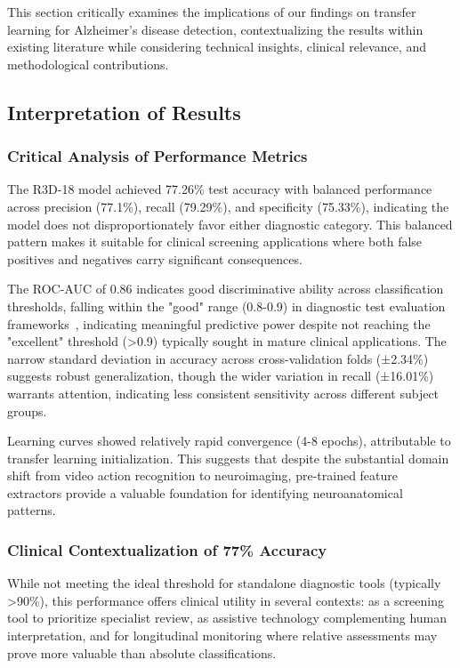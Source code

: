 \documentclass[12pt, a4paper]{article}
\begin{document}
This section critically examines the implications of our findings on transfer learning for Alzheimer's disease detection, contextualizing the results within existing literature while considering technical insights, clinical relevance, and methodological contributions.

\subsection{Interpretation of Results}

\subsubsection{Critical Analysis of Performance Metrics}

The R3D-18 model achieved 77.26\% test accuracy with balanced performance across precision (77.1\%), recall (79.29\%), and specificity (75.33\%), indicating the model does not disproportionately favor either diagnostic category. This balanced pattern makes it suitable for clinical screening applications where both false positives and negatives carry significant consequences.

The ROC-AUC of 0.86 indicates good discriminative ability across classification thresholds, falling within the "good" range (0.8-0.9) in diagnostic test evaluation frameworks~\cite{mandrekar2010receiver}, indicating meaningful predictive power despite not reaching the "excellent" threshold (>0.9) typically sought in mature clinical applications. The narrow standard deviation in accuracy across cross-validation folds (±2.34\%) suggests robust generalization, though the wider variation in recall (±16.01\%) warrants attention, indicating less consistent sensitivity across different subject groups.

Learning curves showed relatively rapid convergence (4-8 epochs), attributable to transfer learning initialization. This suggests that despite the substantial domain shift from video action recognition to neuroimaging, pre-trained feature extractors provide a valuable foundation for identifying neuroanatomical patterns.

\subsubsection{Clinical Contextualization of 77\% Accuracy}

While not meeting the ideal threshold for standalone diagnostic tools (typically >90\%), this performance offers clinical utility in several contexts: as a screening tool to prioritize specialist review, as assistive technology complementing human interpretation, and for longitudinal monitoring where relative assessments may prove more valuable than absolute classifications.
\end{document}

